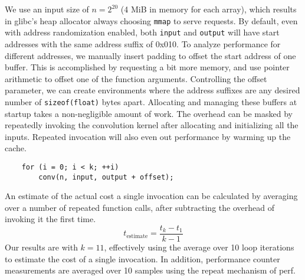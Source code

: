 \documentclass[prodmode,acmtaco]{acmsmall}
\begin{document}
We use an input size of $n=2^{20}$ (4 MiB in memory for each array), which results in glibc's heap allocator always choosing \texttt{mmap} to serve requests.
By default, even with address randomization enabled, both \texttt{input} and \texttt{output} will have start addresses with the same address suffix of 0x010.
To analyze performance for different addresses, we manually insert padding to offset the start address of one buffer.
This is accomplished by requesting a bit more memory, and use pointer arithmetic to offset one of the function arguments.
Controlling the offset parameter, we can create environments where the address suffixes are any desired number of \texttt{sizeof(float)} bytes apart.
Allocating and managing these buffers at startup takes a non-negligible amount of work.
The overhead can be masked by repeatedly invoking the convolution kernel after allocating and initializing all the inputs.
Repeated invocation will also even out performance by warming up the cache.
\begin{lstlisting}
    for (i = 0; i < k; ++i)
        conv(n, input, output + offset);
\end{lstlisting}
An estimate of the actual cost a single invocation can be calculated by averaging over a number of repeated function calls, after subtracting the overhead of invoking it the first time.
\[
t_{\text{estimate}} = \frac{t_{k} - t_{1}}{k - 1}
\]
Our results are with $k=11$, effectively using the average over 10 loop iterations to estimate the cost of a single invocation.
In addition, performance counter measurements are averaged over 10 samples using the repeat mechanism of perf.
\end{document}
